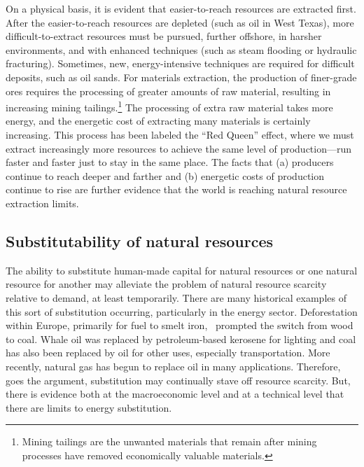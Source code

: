 On a physical basis, 
it is evident that easier-to-reach resources are extracted first. 
After the easier-to-reach resources are depleted (such as oil in West Texas),
more difficult-to-extract resources must be pursued,
further offshore,
in harsher environments, and
with enhanced techniques 
(such as steam flooding or hydraulic fracturing).
Sometimes, new, energy-intensive techniques are required 
for difficult deposits, such as oil sands.
For materials extraction, the production of finer-grade ores
requires the processing of greater amounts of raw material, 
resulting in increasing mining tailings.\footnote{Mining tailings
	are the unwanted materials that remain after mining processes
	have removed economically valuable materials.\cite{Mudd2007}
	}
The processing of extra raw material takes more energy, and 
the energetic cost of extracting many materials is certainly increasing.\cite{Hall1986, Mudd2010, Hall2011}
This process has been labeled the ``Red Queen'' effect, 
where we must extract increasingly more resources to achieve the same
level of production---run faster and faster just to stay in 
the same place.\cite{Lees1975, Ross1988, Murray2013, Murphy2014}
The facts that (a) producers continue to reach deeper and farther 
and (b) energetic costs of production continue to rise
are further evidence that the world is reaching natural resource extraction limits.


\subsection{Substitutability of natural resources}

The ability to substitute human-made capital for natural resources
or one natural resource for another 
may alleviate the problem of natural resource scarcity relative to demand,
at least temporarily.
There are many historical examples of this sort of substitution occurring,
particularly in the energy sector.
Deforestation within Europe,
primarily for fuel to smelt iron,~\cite{Smil1994}
prompted the switch from wood to coal.
Whale oil was replaced by petroleum-based kerosene for lighting and
coal has also been replaced by oil for other uses, 
especially transportation.\cite{Weissenbacher2009}
More recently, natural gas has begun to replace oil in many applications.
Therefore, goes the argument, 
substitution may continually stave off resource scarcity.
But, there is evidence both at the macroeconomic level and 
at a technical level that there are limits to energy substitution.

